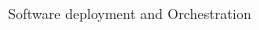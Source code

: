 \documentclass{beamer}
\begin{document}
  \begin{frame}{Software deployment and Orchestration}
    \vspace*{-2.8em}
    \begin{columns}[T]
      \begin{column}{.3\textwidth}
        \centering
      \end{column}
    \end{columns}


\end{frame}
\end{document}
